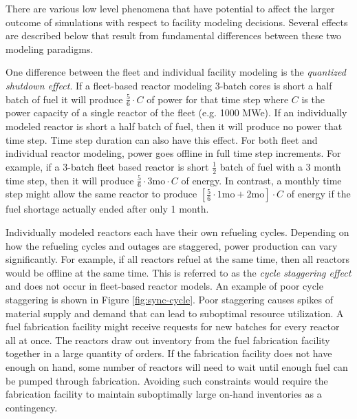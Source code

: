 \documentclass{style}
\begin{document}
There are various low level phenomena that have potential to affect the larger
outcome of simulations with respect to facility modeling decisions. Several
effects are described below that result from fundamental differences between
these two modeling paradigms.

One difference between the fleet and individual facility modeling is the
\emph{quantized shutdown effect}.  If a fleet-based reactor modeling 3-batch
cores is short a half batch of fuel it will produce $\frac{5}{6}\cdot C$ of
power for that time step where $C$ is the power capacity of a single reactor
of the fleet (e.g. 1000 MWe).  If an individually modeled reactor is short a
half batch of fuel, then it will produce no power that time step.  Time step
duration can also have this effect.  For both fleet and individual reactor
modeling, power goes offline in full time step increments.  For example, if a
3-batch fleet based reactor is short $\frac{1}{2}$ batch of fuel with a 3
month time step, then it will produce $\frac{5}{6} \cdot 3 \text{mo} \cdot C $
of energy.  In contrast, a monthly time step might allow the same reactor to
produce $[\frac{5}{6} \cdot 1 \text{mo} + 2 \text{mo}] \cdot C $ of energy if
the fuel shortage actually ended after only 1 month.

Individually modeled reactors each have their own refueling cycles.  Depending
on how the refueling cycles and outages are staggered, power production can
vary significantly.  For example, if all reactors refuel at the same time,
then all reactors would be offline at the same time.  This is referred to as
the \emph{cycle staggering effect} and does not occur in fleet-based reactor
models.  An example of poor cycle staggering is shown in Figure
\ref{fig:sync-cycle}.  Poor staggering causes spikes of material supply and
demand that can lead to suboptimal resource utilization.  A fuel fabrication
facility might receive requests for new batches for every reactor all at once.
The reactors draw out inventory from the fuel fabrication facility together in
a large quantity of orders.  If the fabrication facility does not have enough
on hand, some number of reactors will need to wait until enough fuel can be
pumped through fabrication.  Avoiding such constraints would require the
fabrication facility to maintain suboptimally large on-hand inventories as a
contingency.
\end{document}
